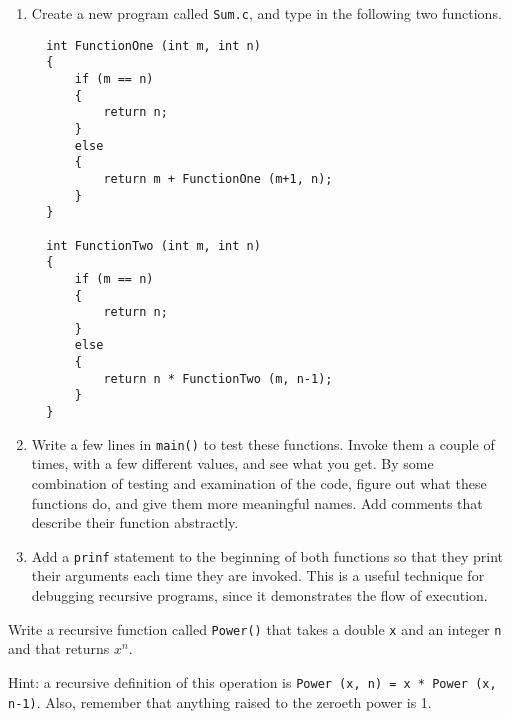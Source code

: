 \begin{exercise}
\begin{enumerate}


\item Create a new program called {\tt Sum.c},
and type in the following two functions.

\begin{verbatim}
  int FunctionOne (int m, int n) 
  {
      if (m == n) 
      {
          return n;
      } 
      else 
      {
          return m + FunctionOne (m+1, n);
      }
  }

  int FunctionTwo (int m, int n) 
  {
      if (m == n) 
      {
          return n;
      } 
      else 
      {
          return n * FunctionTwo (m, n-1);
      }
  }
\end{verbatim}
%
\item Write a few lines in {\tt main()} to test these functions.
Invoke them a couple of times, with a few different values,
and see what you get.  By some combination of testing and
examination of the code, figure out what these functions do,
and give them more meaningful names.  Add comments that
describe their function abstractly.

\item Add a {\tt prinf} statement to the beginning of both
functions so that they print their arguments each time they are
invoked.  This is a useful technique for debugging recursive
programs, since it demonstrates the flow of execution.

\end{enumerate}
\end{exercise}

\begin{exercise}
\label{ex.power}
Write a recursive function called {\tt Power()} that
takes a double {\tt x} and an integer {\tt n} and that
returns $x^n$.  

Hint: a recursive definition of this
operation is {\tt Power (x, n) = x * Power (x, n-1)}.
Also, remember that anything raised to the zeroeth power
is 1.
\end{exercise}


